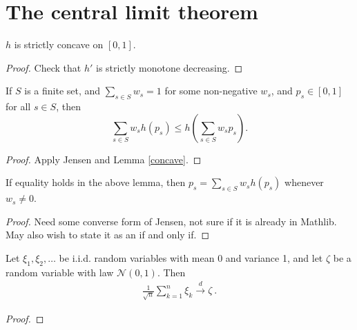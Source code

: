 \chapter{The central limit theorem}


\begin{lemma}[Concavity]\label{concave}
  \leanok
  $h$ is strictly concave on $[0,1]$.
\end{lemma}

\begin{proof} \leanok Check that $h'$ is strictly monotone decreasing.
\end{proof}

\begin{lemma}[Jensen]\label{jensen}
   \leanok
  If $S$ is a finite set, and $\sum_{s \in S} w_s = 1$ for some non-negative $w_s$, and $p_s \in [0,1]$ for all $s \in S$, then
  $$ \sum_{s \in S} w_s h(p_s) \leq h(\sum_{s \in S} w_s p_s).$$
\end{lemma}

\begin{proof} \leanok Apply Jensen and Lemma \ref{concave}.
\end{proof}

\begin{lemma}\label{converse-jensen}
  \leanok
If equality holds in the above lemma, then $p_s = \sum_{s \in S} w_s h(p_s)$ whenever $w_s \neq 0$.
\end{lemma}

\begin{proof} \leanok Need some converse form of Jensen, not sure if it is already in Mathlib.  May also wish to state it as an if and only if.
\end{proof}

\begin{theorem}\label{clt}
Let $\xi_1, \xi_2, \ldots$ be i.i.d. random variables with mean 0 and variance 1, and let $\zeta$ be a random variable with law $\mathcal N(0,1)$. Then
\begin{align*}
\frac{1}{\sqrt{n}}\sum_{k=1}^n \xi_k \xrightarrow{d} \zeta \: .
\end{align*}
\end{theorem}

\begin{proof}
\end{proof}
